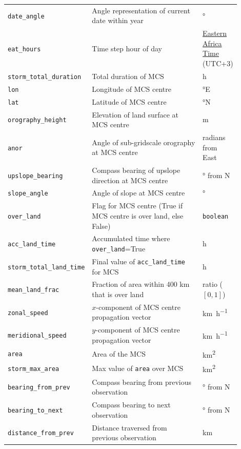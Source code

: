 {\begin{longtable}{>{\raggedright\arraybackslash}p{0.25\linewidth} p{0.50\linewidth} >{\raggedright\arraybackslash}p{0.15\linewidth}}
    \texttt{date\_angle} & Angle representation of current date within year & \unit{\degree} \\
    \texttt{eat\_hours} & Time step hour of day & \href{https://www.timeanddate.com/time/zones/eat}{Eastern Africa Time} (UTC+3) \\
    \texttt{storm\_total\_duration} & Total duration of MCS & \unit{\hour} \\
    \texttt{lon} & Longitude of MCS centre & \unit{\degree}E \\
    \texttt{lat} & Latitude of MCS centre & \unit{\degree}N \\
    \texttt{orography\_height} & Elevation of land surface at MCS centre & \unit{\meter} \\
    \texttt{anor} & Angle of sub-gridscale orography at MCS centre & radians from East \\
    \texttt{upslope\_bearing} & Compass bearing of upslope direction at MCS centre & \unit{\degree} from  N \\
    \texttt{slope\_angle} & Angle of slope at MCS centre & \unit{\degree} \\
    \texttt{over\_land} & Flag for MCS centre (True if MCS centre is over land, else False) & \texttt{boolean} \\
    \texttt{acc\_land\_time} & Accumulated time where \texttt{over\_land}=True & \unit{\hour} \\
    \texttt{storm\_total\_land\_time} & Final value of \texttt{acc\_land\_time} for MCS & \unit{\hour} \\
    \texttt{mean\_land\_frac} & Fraction of area within 400 km that is over land & ratio ($[0,1]$) \\
    \texttt{zonal\_speed} & $x$-component of MCS centre propagation vector & \unit{\km\per\hour} \\
    \texttt{meridional\_speed} & $y$-component of MCS centre propagation vector & \unit{\km\per\hour} \\
    \texttt{area} & Area of the MCS & \unit{\km\squared} \\
    \texttt{storm\_max\_area} & Max value of \texttt{area} over MCS & \unit{\km\squared} \\
    \texttt{bearing\_from\_prev} & Compass bearing from previous observation & \unit{\degree} from  N \\
    \texttt{bearing\_to\_next} & Compass bearing to next observation & \unit{\degree} from  N \\
    \texttt{distance\_from\_prev} & Distance traversed from previous observation & \unit{\km} \\

\end{longtable}}
